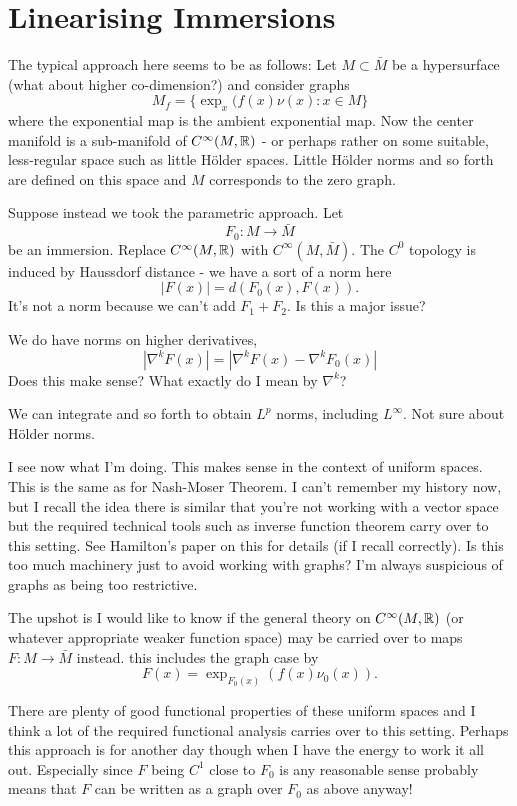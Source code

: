 \documentclass{amsart}
\begin{document}
\section{Linearising Immersions}
\label{sec:linearising_immersions}

The typical approach here seems to be as follows: Let \(M \subset \bar{M}\) be a hypersurface (what about higher co-dimension?) and consider graphs
\[
M_f = \{\exp_x(f(x)\nu(x) : x \in M\}
\]
where the exponential map is the ambient exponential map. Now the center manifold is a sub-manifold of \(C^{\infty}(M, \mathbb{R})\) - or perhaps rather on some suitable, less-regular space such as little H\"older spaces. Little H\"older norms and so forth are defined on this space and \(M\) corresponds to the zero graph.

Suppose instead we took the parametric approach. Let
\[
F_0 : M \to \bar{M}
\]
be an immersion. Replace \(C^{\infty}(M, \mathbb{R})\) with \(C^{\infty} (M, \bar{M})\). The \(C^0\) topology is induced by Haussdorf distance - we have a sort of a norm here
\[
|F(x)| = d(F_0(x), F(x)).
\]
It's not a norm because we can't add $F_1 + F_2$. Is this a major issue?

We do have norms on higher derivatives,
\[
|\nabla^k F (x)| = |\nabla^k F(x) - \nabla^k F_0(x)|
\]
Does this make sense? What exactly do I mean by \(\nabla^k\)? 

We can integrate and so forth to obtain \(L^p\) norms, including \(L^{\infty}\). Not sure about H\"older norms. 

I see now what I'm doing. This makes sense in the context of uniform spaces. This is the same as for Nash-Moser Theorem. I can't remember my history now, but I recall the idea there is similar that you're not working with a vector space but the required technical tools such as inverse function theorem carry over to this setting. See Hamilton's paper on this for details (if I recall correctly). Is this too much machinery just to avoid working with graphs? I'm always suspicious of graphs as being too restrictive.

The upshot is I would like to know if the general theory on \(C^{\infty}(M, \mathbb{R})\) (or whatever appropriate weaker function space) may be carried over to maps \(F : M \to \bar{M}\) instead. this includes the graph case by
\[
F(x) = \exp_{F_0(x)} (f(x) \nu_0(x)).
\]

There are plenty of good functional properties of these uniform spaces and I think a lot of the required functional analysis carries over to this setting. Perhaps this approach is for another day though when I have the energy to work it all out. Especially since \(F\) being \(C^1\) close to \(F_0\) is any reasonable sense probably means that \(F\) can be written as a graph over \(F_0\) as above anyway!



\end{document}
